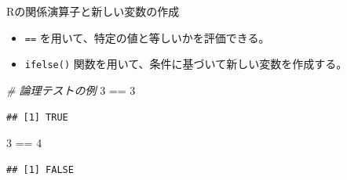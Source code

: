 \documentclass[
  ignorenonframetext,
]{beamer}
\newenvironment{Shaded}{\begin{snugshade}}{\end{snugshade}}
\newcommand{\CommentTok}[1]{\textcolor[rgb]{0.56,0.35,0.01}{\textit{#1}}}
\newcommand{\DecValTok}[1]{\textcolor[rgb]{0.00,0.00,0.81}{#1}}
\newcommand{\FunctionTok}[1]{\textcolor[rgb]{0.00,0.00,0.00}{#1}}
\newcommand{\NormalTok}[1]{#1}
\newcommand{\OtherTok}[1]{\textcolor[rgb]{0.56,0.35,0.01}{#1}}
\newcommand{\SpecialCharTok}[1]{\textcolor[rgb]{0.00,0.00,0.00}{#1}}
\newcommand{\StringTok}[1]{\textcolor[rgb]{0.31,0.60,0.02}{#1}}
\providecommand{\tightlist}{%
  \setlength{\itemsep}{0pt}\setlength{\parskip}{0pt}}
\begin{document}
\begin{frame}[fragile]{Rの関係演算子と新しい変数の作成}
\protect\hypertarget{rux306eux95a2ux4fc2ux6f14ux7b97ux5b50ux3068ux65b0ux3057ux3044ux5909ux6570ux306eux4f5cux6210}{}
\begin{itemize}
\tightlist
\item
  \texttt{==} を用いて、特定の値と等しいかを評価できる。
\item
  \texttt{ifelse()} 関数を用いて、条件に基づいて新しい変数を作成する。
\end{itemize}

\begin{Shaded}
\begin{Highlighting}[]
\CommentTok{\# 論理テストの例}
\DecValTok{3} \SpecialCharTok{==} \DecValTok{3}
\end{Highlighting}
\end{Shaded}

\begin{verbatim}
## [1] TRUE
\end{verbatim}

\begin{Shaded}
\begin{Highlighting}[]
\DecValTok{3} \SpecialCharTok{==} \DecValTok{4}
\end{Highlighting}
\end{Shaded}

\begin{verbatim}
## [1] FALSE
\end{verbatim}

\begin{Shaded}
\end{Shaded}
\end{frame}
\end{document}
